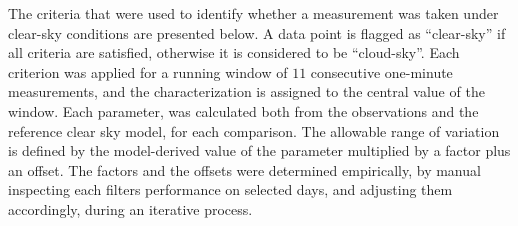 \documentclass[
  preprint, 3p, authoryear]{article}
\begin{document}
The criteria that were used to identify whether a measurement was taken
under clear-sky conditions are presented below.
A data point is flagged
as ``clear-sky'' if all criteria are satisfied, otherwise it is considered to be ``cloud-sky''.
Each criterion was applied
for a running window of \(11\) consecutive one-minute measurements, and
the characterization is assigned to the central value of the window.
Each parameter, was calculated both from the observations and the
reference clear sky model, for each comparison.
The allowable range of variation is defined by the
model-derived value of the parameter multiplied by a factor plus an
offset.
The factors and the offsets were
determined empirically, by manual inspecting each filters performance on
selected days, and adjusting them accordingly, during an iterative
process.
\end{document}
